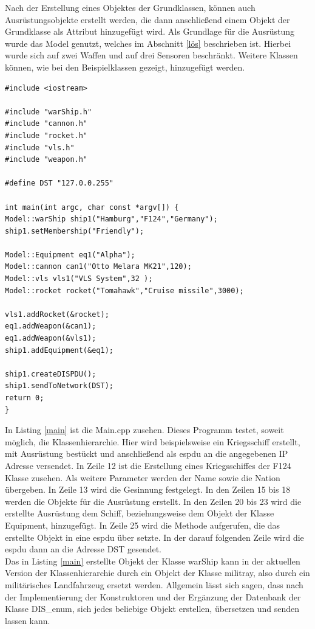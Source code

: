 Nach der Erstellung eines Objektes der Grundklassen, können auch Ausrüstungsobjekte erstellt werden, die dann anschließend einem Objekt der Grundklasse als Attribut hinzugefügt wird. Als Grundlage für die Ausrüstung wurde das Model genutzt, welches im Abschnitt \ref{lös} beschrieben ist. Hierbei wurde sich auf zwei Waffen und auf drei Sensoren beschränkt. Weitere Klassen können, wie bei den Beispielklassen gezeigt, hinzugefügt werden. \\
\begin{lstlisting}[caption = main.cpp ,label= main]
#include <iostream>

#include "warShip.h"
#include "cannon.h"
#include "rocket.h"
#include "vls.h"
#include "weapon.h"

#define DST "127.0.0.255"

int main(int argc, char const *argv[]) {
Model::warShip ship1("Hamburg","F124","Germany");
ship1.setMembership("Friendly");

Model::Equipment eq1("Alpha");
Model::cannon can1("Otto Melara MK21",120);
Model::vls vls1("VLS System",32 );
Model::rocket rocket("Tomahawk","Cruise missile",3000);

vls1.addRocket(&rocket);
eq1.addWeapon(&can1);
eq1.addWeapon(&vls1);
ship1.addEquipment(&eq1);

ship1.createDISPDU();
ship1.sendToNetwork(DST);
return 0;
}
\end{lstlisting}
In Listing \ref{main} ist die Main.cpp zusehen. Dieses Programm testet, soweit möglich, die Klassenhierarchie. Hier wird beispielsweise ein Kriegsschiff erstellt, mit Ausrüstung  bestückt und anschließend als \ac{espdu} an die angegebenen IP Adresse versendet.
In Zeile 12 ist die Erstellung eines Kriegsschiffes der F124 Klasse zusehen. Als weitere Parameter werden der Name sowie die Nation übergeben. In Zeile 13 wird die Gesinnung festgelegt.   In den Zeilen 15 bis 18 werden die Objekte für die Ausrüstung erstellt. In den Zeilen 20 bis 23 wird die erstellte Ausrüstung dem Schiff, beziehungsweise dem Objekt der Klasse \glqq Equipment\grqq{}, hinzugefügt. In Zeile 25 wird die Methode aufgerufen, die das erstellte Objekt in eine \ac{espdu} über setzte. In der darauf folgenden Zeile wird die \ac{espdu} dann an die Adresse \glqq DST\grqq{} gesendet.\\ 
Das in Listing \ref{main} erstellte Objekt der Klasse \glqq warShip\grqq{} kann in der aktuellen Version der Klassenhierarchie durch ein Objekt der Klasse \glqq militray\grqq{}, also durch ein militärisches Landfahrzeug ersetzt werden. Allgemein lässt sich sagen, dass nach der Implementierung der Konstruktoren und der Ergänzung der Datenbank der Klasse \glqq DIS\_enum\grqq{}, sich jedes beliebige Objekt erstellen, übersetzen und senden lassen kann.  

